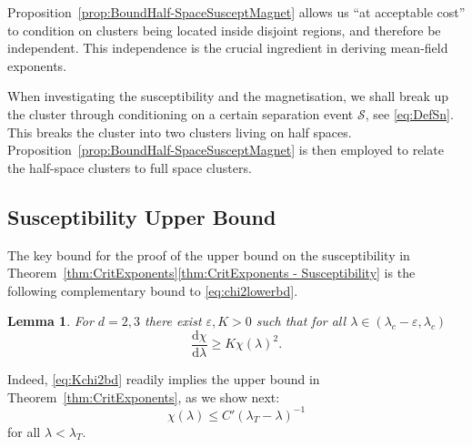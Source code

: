 \documentclass[10pt,a4paper,dvipsnames]{article}
\newtheorem{lemma}[theorem]{Lemma}
\theoremstyle{definition}
\theoremstyle{remark}
\newcommand{\dd}{\mathrm{d}} %
\numberwithin{equation}{section}
\begin{document}
Proposition~\ref{prop:BoundHalf-SpaceSusceptMagnet} allows us ``at acceptable cost'' to condition on clusters being located inside disjoint regions, and therefore be independent. This independence is the crucial ingredient in deriving mean-field exponents. 

When investigating the susceptibility and the magnetisation, we shall break up the cluster through conditioning on a certain separation event $\mathcal S$, see \eqref{eq:DefSn}. This breaks the cluster into two clusters living on half spaces. Proposition~\ref{prop:BoundHalf-SpaceSusceptMagnet} is then employed to relate the half-space clusters to full space clusters. 







\subsection{Susceptibility Upper Bound}
\label{sec:SusceptibilityUpperBound}

The key bound for the proof of the upper bound on the susceptibility in Theorem~\ref{thm:CritExponents}\ref{thm:CritExponents - Susceptibility} is the following complementary bound to \eqref{eq:chi2lowerbd}. 

\begin{lemma}
    \label{lem:susceptibilityderivativeLowerBound}
    For $d=2,3$ there exist $\varepsilon,K>0$ such that for all $\lambda\in\left(\lambda_c-\varepsilon,\lambda_c\right)$
    \begin{equation}\label{eq:Kchi2bd}
        \frac{\dd \chi}{\dd \lambda} \geq K\chi\left(\lambda\right)^2.
    \end{equation}
\end{lemma}
Indeed, \eqref{eq:Kchi2bd} readily implies the upper bound in Theorem~\ref{thm:CritExponents}, as we show next:  
\begin{equation}
    \chi\left(\lambda\right) \leq C'\left(\lambda_T-\lambda\right)^{-1}
\end{equation}
for all $\lambda<\lambda_T$.
\end{document}
